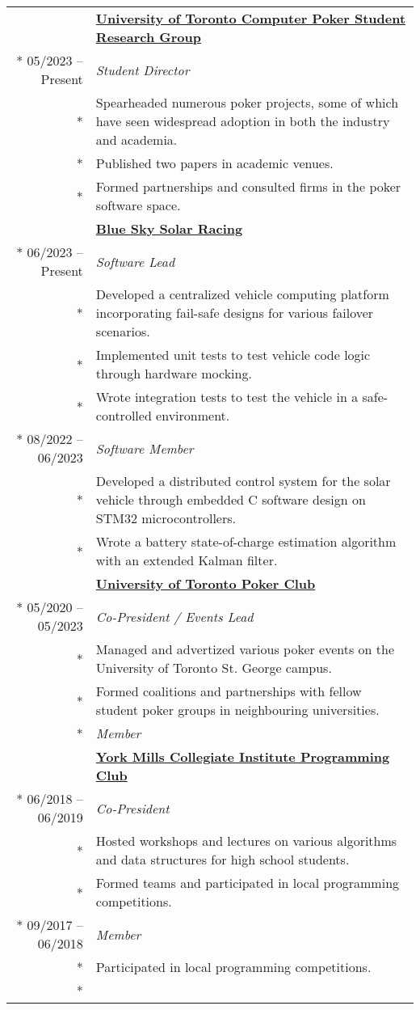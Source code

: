 \documentclass{article}
\begin{document}
	\begin{tabularx}{\textwidth}{r X}
		& \textbf{\href{https://uoftcprg.com/}{University of Toronto Computer Poker Student Research Group}} \\*
		05/2023 -- Present & \textit{Student Director} \\*
		& {\small Spearheaded numerous poker projects, some of which have seen widespread adoption in both the industry and academia.} \\*
		& {\small Published two papers in academic venues.} \\*
		& {\small Formed partnerships and consulted firms in the poker software space.} \\
		\addlinespace
		& \textbf{\href{https://www.blueskysolar.org/}{Blue Sky Solar Racing}} \\*
		06/2023 -- Present & \textit{Software Lead} \\*
		& {\small Developed a centralized vehicle computing platform incorporating fail-safe designs for various failover scenarios.} \\*
		& {\small Implemented unit tests to test vehicle code logic through hardware mocking.} \\*
		& {\small Wrote integration tests to test the vehicle in a safe-controlled environment.} \\*
		08/2022 -- 06/2023 & \textit{Software Member} \\*
		& {\small Developed a distributed control system for the solar vehicle through embedded C software design on STM32 microcontrollers.} \\*
		& {\small Wrote a battery state-of-charge estimation algorithm with an extended Kalman filter.} \\
		\addlinespace
		& \textbf{\href{https://uoftpoker.com/}{University of Toronto Poker Club}} \\*
		05/2020 -- 05/2023 & \textit{Co-President / Events Lead} \\*
		& {\small Managed and advertized various poker events on the University of Toronto St. George campus.} \\*
		& {\small Formed coalitions and partnerships with fellow student poker groups in neighbouring universities.} \\*
		\iftoggle{verbose}{
			09/2019 -- 05/2020 & \textit{Member} \\
			\addlinespace
			& \textbf{\href{https://schoolweb.tdsb.on.ca/yorkmillsci/Departments/Computer-Science/Clubs}{York Mills Collegiate Institute Programming Club}} \\*
			06/2018 -- 06/2019 & \textit{Co-President} \\*
			& {\small Hosted workshops and lectures on various algorithms and data structures for high school students.} \\*
			& {\small Formed teams and participated in local programming competitions.} \\*
			09/2017 -- 06/2018 & \textit{Member} \\*
			& {\small Participated in local programming competitions.} \\*
		}{}
	\end{tabularx}
\end{document}
